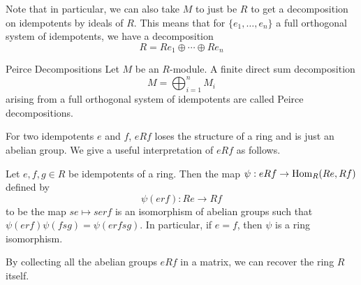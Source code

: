 \documentclass[a4paper]{article}
\begin{document}
Note that in particular, we can also take $M$ to just be $R$ to get a decomposition on idempotents by ideals of $R$. This means that for $\{e_1,\dots,e_n\}$ a full orthogonal system of idempotents, we have a decomposition $$R=Re_1\oplus\cdots\oplus Re_n$$

\begin{defn}{Peirce Decompositions}{} Let $M$ be an $R$-module. A finite direct sum decomposition $$M=\bigoplus_{i=1}^nM_i$$ arising from a full orthogonal system of idempotents are called Peirce decompositions. 
\end{defn}

For two idempotents $e$ and $f$, $eRf$ loses the structure of a ring and is just an abelian group. We give a useful interpretation of $eRf$ as follows. 

\begin{prp}{}{} Let $e,f,g\in R$ be idempotents of a ring. Then the map $\psi:eRf\to\operatorname{Hom}_R(Re,Rf)$ defined by $$\psi(erf):Re\to Rf$$ to be the map $se\mapsto serf$ is an isomorphism of abelian groups such that $\psi(erf)\psi(fsg)=\psi(erfsg)$. In particular, if $e=f$, then $\psi$ is a ring isomorphism. 
\end{prp}

By collecting all the abelian groups $eRf$ in a matrix, we can recover the ring $R$ itself. 
\end{document}
